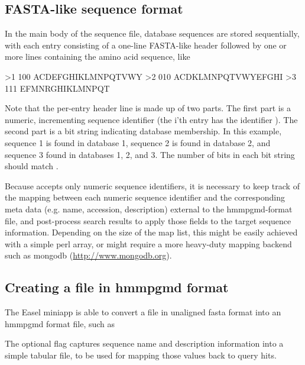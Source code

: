 \subsection{FASTA-like sequence format}

In the main body of the sequence file, database sequences are stored
sequentially, with each entry consisting of a one-line FASTA-like
header followed by one or more lines containing the amino acid sequence, 
like

\begin{sreoutput}
>1 100
ACDEFGHIKLMNPQTVWY
>2 010
ACDKLMNPQTVWYEFGHI
>3 111
EFMNRGHIKLMNPQT
\end{sreoutput}

Note that the per-entry header line is made up of two parts. The first part 
is a numeric, incrementing sequence identifier (the i'th entry has the
identifier ). The second part is a bit string indicating database
membership. In this example, sequence 1 is found in database 1, sequence 2 is
found in database 2, and sequence 3 found in databases 1, 2, and 3. The number 
of bits in each bit string should match .

Because  accepts only numeric sequence identifiers, it is
necessary to keep track of the mapping between each numeric sequence identifier
and the corresponding meta data (e.g. name, accession, description) external to
the hmmpgmd-format file, and post-process  search results to 
apply those fields to the target sequence information.
Depending on the size of the map list, this might be easily achieved with a
simple perl array, or might require a more heavy-duty mapping backend such as
mongodb (\url{http://www.mongodb.org}).
  

\subsection{Creating a file in hmmpgmd format}

The Easel miniapp  is able to convert a file in unaligned
fasta format into an hmmpgmd format file, such as


The optional  flag captures sequence name and description
information into a simple tabular file, to be used for mapping those values 
back to  query hits.



